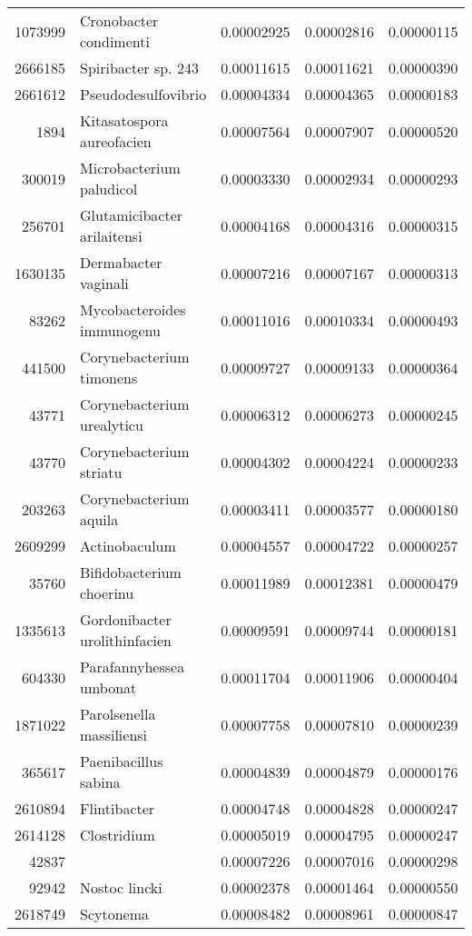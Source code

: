 \begin{table}[ht]
\begin{tabular}{rlrrr}
  1073999 & Cronobacter condimenti & 0.00002925 & 0.00002816 & 0.00000115 \\ 
  2666185 & Spiribacter sp. 243 & 0.00011615 & 0.00011621 & 0.00000390 \\ 
  2661612 & Pseudodesulfovibrio & 0.00004334 & 0.00004365 & 0.00000183 \\ 
  1894 & Kitasatospora aureofacien & 0.00007564 & 0.00007907 & 0.00000520 \\ 
  300019 & Microbacterium paludicol & 0.00003330 & 0.00002934 & 0.00000293 \\ 
  256701 & Glutamicibacter arilaitensi & 0.00004168 & 0.00004316 & 0.00000315 \\ 
  1630135 & Dermabacter vaginali & 0.00007216 & 0.00007167 & 0.00000313 \\ 
  83262 & Mycobacteroides immunogenu & 0.00011016 & 0.00010334 & 0.00000493 \\ 
  441500 & Corynebacterium timonens & 0.00009727 & 0.00009133 & 0.00000364 \\ 
  43771 & Corynebacterium urealyticu & 0.00006312 & 0.00006273 & 0.00000245 \\ 
  43770 & Corynebacterium striatu & 0.00004302 & 0.00004224 & 0.00000233 \\ 
  203263 & Corynebacterium aquila & 0.00003411 & 0.00003577 & 0.00000180 \\ 
  2609299 & Actinobaculum & 0.00004557 & 0.00004722 & 0.00000257 \\ 
  35760 & Bifidobacterium choerinu & 0.00011989 & 0.00012381 & 0.00000479 \\ 
  1335613 & Gordonibacter urolithinfacien & 0.00009591 & 0.00009744 & 0.00000181 \\ 
  604330 & Parafannyhessea umbonat & 0.00011704 & 0.00011906 & 0.00000404 \\ 
  1871022 & Parolsenella massiliensi & 0.00007758 & 0.00007810 & 0.00000239 \\ 
  365617 & Paenibacillus sabina & 0.00004839 & 0.00004879 & 0.00000176 \\ 
  2610894 & Flintibacter & 0.00004748 & 0.00004828 & 0.00000247 \\ 
  2614128 & Clostridium & 0.00005019 & 0.00004795 & 0.00000247 \\ 
  42837 &   & 0.00007226 & 0.00007016 & 0.00000298 \\ 
  92942 & Nostoc lincki & 0.00002378 & 0.00001464 & 0.00000550 \\ 
  2618749 & Scytonema & 0.00008482 & 0.00008961 & 0.00000847 \\ 

\end{tabular}
\end{table}
